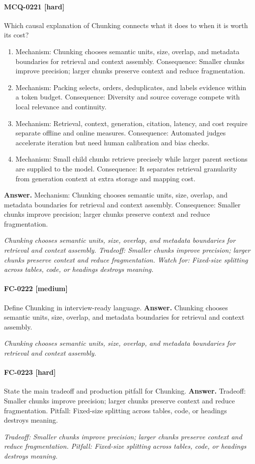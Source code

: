 \paragraph{MCQ-0221 [hard]} Which causal explanation of Chunking connects what it does to when it is worth its cost?
\begin{enumerate}[label=\Alph*.]
\item Mechanism: Chunking chooses semantic units, size, overlap, and metadata boundaries for retrieval and context assembly. Consequence: Smaller chunks improve precision; larger chunks preserve context and reduce fragmentation.
\item Mechanism: Packing selects, orders, deduplicates, and labels evidence within a token budget. Consequence: Diversity and source coverage compete with local relevance and continuity.
\item Mechanism: Retrieval, context, generation, citation, latency, and cost require separate offline and online measures. Consequence: Automated judges accelerate iteration but need human calibration and bias checks.
\item Mechanism: Small child chunks retrieve precisely while larger parent sections are supplied to the model. Consequence: It separates retrieval granularity from generation context at extra storage and mapping cost.
\end{enumerate}
\noindent\textbf{Answer.} Mechanism: Chunking chooses semantic units, size, overlap, and metadata boundaries for retrieval and context assembly. Consequence: Smaller chunks improve precision; larger chunks preserve context and reduce fragmentation.
\par\textit{Chunking chooses semantic units, size, overlap, and metadata boundaries for retrieval and context assembly. Tradeoff: Smaller chunks improve precision; larger chunks preserve context and reduce fragmentation. Watch for: Fixed-size splitting across tables, code, or headings destroys meaning.}
\paragraph{FC-0222 [medium]} Define Chunking in interview-ready language.
\noindent\textbf{Answer.} Chunking chooses semantic units, size, overlap, and metadata boundaries for retrieval and context assembly.
\par\textit{Chunking chooses semantic units, size, overlap, and metadata boundaries for retrieval and context assembly.}
\paragraph{FC-0223 [hard]} State the main tradeoff and production pitfall for Chunking.
\noindent\textbf{Answer.} Tradeoff: Smaller chunks improve precision; larger chunks preserve context and reduce fragmentation. Pitfall: Fixed-size splitting across tables, code, or headings destroys meaning.
\par\textit{Tradeoff: Smaller chunks improve precision; larger chunks preserve context and reduce fragmentation. Pitfall: Fixed-size splitting across tables, code, or headings destroys meaning.}
